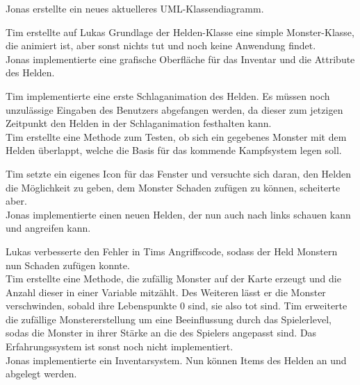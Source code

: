 
Jonas erstellte ein neues aktuelleres UML-Klassendiagramm.\\


Tim erstellte auf Lukas Grundlage der Helden-Klasse eine simple Monster-Klasse, die animiert ist, aber sonst nichts tut und noch keine Anwendung findet. \\
Jonas implementierte eine grafische Oberfläche für das Inventar und die Attribute des Helden. \\


Tim implementierte eine erste Schlaganimation des Helden. Es müssen noch \glqq{}unzulässige Eingaben\grqq{} des Benutzers abgefangen werden, da dieser zum jetzigen Zeitpunkt den Helden in der Schlaganimation festhalten kann. \\
Tim erstellte eine Methode zum Testen, ob sich ein gegebenes Monster mit dem Helden überlappt, welche die Basis für das kommende Kampfsystem legen soll.\\


Tim setzte ein eigenes Icon für das Fenster und versuchte sich daran, den Helden die Möglichkeit zu geben, dem Monster Schaden zufügen zu können, scheiterte aber. \\
Jonas implementierte einen neuen Helden, der nun auch nach links schauen kann und angreifen kann. \\


Lukas verbesserte den Fehler in Tims \glqq{}Angriffscode\grqq{}, sodass der Held Monstern nun Schaden zufügen konnte. \\
Tim erstellte eine Methode, die zufällig Monster auf der Karte erzeugt und die Anzahl dieser in einer Variable mitzählt. Des Weiteren lässt er die Monster verschwinden, sobald ihre Lebenspunkte 0 sind, sie also tot sind. Tim erweiterte die zufällige Monstererstellung um eine Beeinflussung durch das Spielerlevel, sodas die Monster in ihrer Stärke an die des Spielers angepasst sind. Das Erfahrungssystem ist sonst noch nicht implementiert. \\
Jonas implementierte ein Inventarsystem. Nun können Items des Helden an und abgelegt werden. \\

